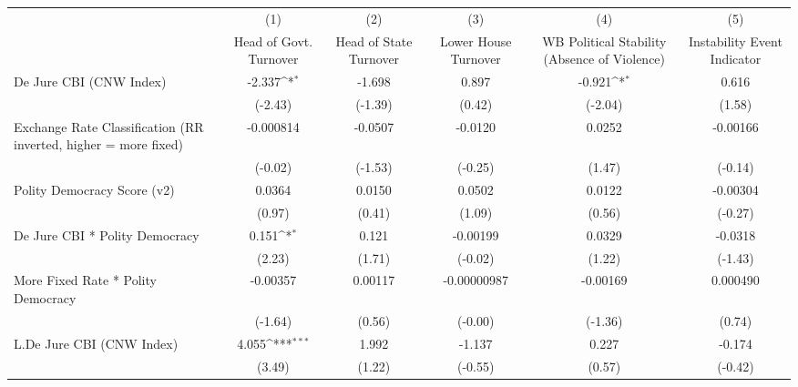 {
\def\sym#1{\ifmmode^{#1}\else\(^{#1}\)\fi}
\begin{tabular}{l*{5}{c}}
\hline\hline
                &\multicolumn{1}{c}{(1)}&\multicolumn{1}{c}{(2)}&\multicolumn{1}{c}{(3)}&\multicolumn{1}{c}{(4)}&\multicolumn{1}{c}{(5)}\\
                &\multicolumn{1}{c}{Head of Govt. Turnover}&\multicolumn{1}{c}{Head of State Turnover}&\multicolumn{1}{c}{Lower House Turnover}&\multicolumn{1}{c}{WB Political Stability (Absence of Violence)}&\multicolumn{1}{c}{Instability Event Indicator}\\
\hline
De Jure CBI (CNW Index)&   -2.337\sym{*}  &   -1.698         &    0.897         &   -0.921\sym{*}  &    0.616         \\
                &  (-2.43)         &  (-1.39)         &   (0.42)         &  (-2.04)         &   (1.58)         \\
[1em]
Exchange Rate Classification (RR inverted, higher = more fixed)&-0.000814         &  -0.0507         &  -0.0120         &   0.0252         & -0.00166         \\
                &  (-0.02)         &  (-1.53)         &  (-0.25)         &   (1.47)         &  (-0.14)         \\
[1em]
Polity Democracy Score (v2)&   0.0364         &   0.0150         &   0.0502         &   0.0122         & -0.00304         \\
                &   (0.97)         &   (0.41)         &   (1.09)         &   (0.56)         &  (-0.27)         \\
[1em]
De Jure CBI * Polity Democracy&    0.151\sym{*}  &    0.121         & -0.00199         &   0.0329         &  -0.0318         \\
                &   (2.23)         &   (1.71)         &  (-0.02)         &   (1.22)         &  (-1.43)         \\
[1em]
More Fixed Rate * Polity Democracy& -0.00357         &  0.00117         &-0.00000987         & -0.00169         & 0.000490         \\
                &  (-1.64)         &   (0.56)         &  (-0.00)         &  (-1.36)         &   (0.74)         \\
[1em]
L.De Jure CBI (CNW Index)&    4.055\sym{***}&    1.992         &   -1.137         &    0.227         &   -0.174         \\
                &   (3.49)         &   (1.22)         &  (-0.55)         &   (0.57)         &  (-0.42)         \\
[1em]

\end{tabular}}
